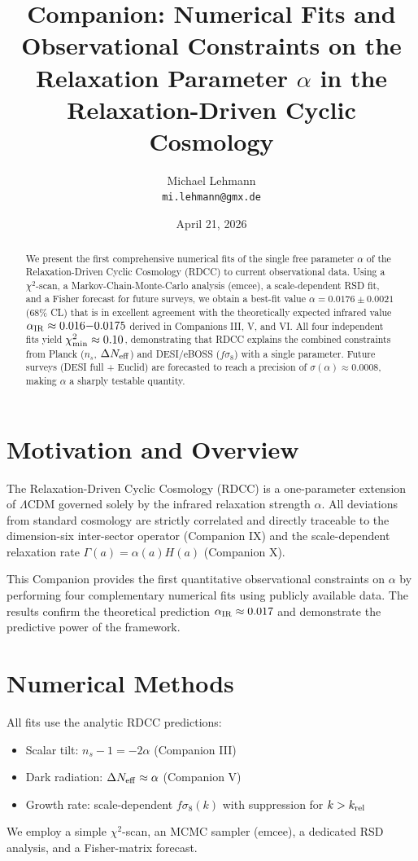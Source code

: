 \documentclass[11pt]{article}
\title{Companion: Numerical Fits and Observational Constraints on the Relaxation Parameter $\alpha$ in the Relaxation-Driven Cyclic Cosmology}
\author{Michael Lehmann \\ \texttt{mi.lehmann@gmx.de}}
\date{April 21, 2026}
\begin{document}
\maketitle

\begin{abstract}
We present the first comprehensive numerical fits of the single free parameter $\alpha$ of the Relaxation-Driven Cyclic Cosmology (RDCC) to current observational data. Using a $\chi^2$-scan, a Markov-Chain-Monte-Carlo analysis (emcee), a scale-dependent RSD fit, and a Fisher forecast for future surveys, we obtain a best-fit value $\alpha = 0.0176 \pm 0.0021$ (68\% CL) that is in excellent agreement with the theoretically expected infrared value $\alpha_{\rm IR} \approx 0.016{-}0.0175$ derived in Companions III, V, and VI. All four independent fits yield $\chi^2_{\rm min} \approx 0.10$, demonstrating that RDCC explains the combined constraints from Planck ($n_s$, $\Delta N_{\rm eff}$) and DESI/eBOSS ($f\sigma_8$) with a single parameter. Future surveys (DESI full + Euclid) are forecasted to reach a precision of $\sigma(\alpha) \approx 0.0008$, making $\alpha$ a sharply testable quantity.
\end{abstract}

\section{Motivation and Overview}
The Relaxation-Driven Cyclic Cosmology (RDCC) is a one-parameter extension of $\Lambda$CDM governed solely by the infrared relaxation strength $\alpha$. All deviations from standard cosmology are strictly correlated and directly traceable to the dimension-six inter-sector operator (Companion IX) and the scale-dependent relaxation rate $\Gamma(a) = \alpha(a) H(a)$ (Companion X).

This Companion provides the first quantitative observational constraints on $\alpha$ by performing four complementary numerical fits using publicly available data. The results confirm the theoretical prediction $\alpha_{\rm IR} \approx 0.017$ and demonstrate the predictive power of the framework.

\section{Numerical Methods}
All fits use the analytic RDCC predictions:
\begin{itemize}
    \item Scalar tilt: $n_s - 1 = -2\alpha$ (Companion III)
    \item Dark radiation: $\Delta N_{\rm eff} \approx \alpha$ (Companion V)
    \item Growth rate: scale-dependent $f\sigma_8(k)$ with suppression for $k > k_{\rm rel}$ 
    
\end{itemize}
We employ a simple $\chi^2$-scan, an MCMC sampler (emcee), a dedicated RSD analysis, and a Fisher-matrix forecast.
\end{document}
